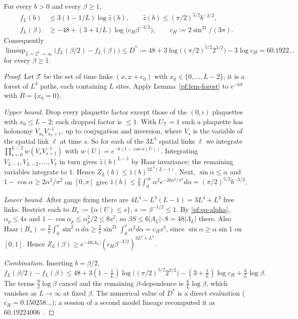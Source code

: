 \begin{lemma}\label{pf:lem-free}
For every $b>0$ and every $\beta\ge1$,
\begin{align*}
f_L(b)&\le3(1-1/L)\log\hat z(b),\qquad \hat z(b)\le(\pi/2)^{5/2}b^{-3/2},\\
f_L(\beta)&\ge-48+(3+1/L)\log\big(c_H\beta^{-3/2}\big),\qquad c_H:=2\sin^21/(3\pi).
\end{align*}
Consequently $\limsup_{L=2^k\to\infty}\big(f_L(\beta/2)-f_L(\beta)\big)\le D^*:=48+3\log\big((\pi/2)^{5/2}2^{3/2}\big)-3\log c_H=60.1922\ldots$ for every $\beta\ge1$.
\end{lemma}

\begin{proof}
Let $\mathcal T$ be the set of time links $(x,x+e_0)$ with $x_0\in\{0,\dots,L-2\}$; it is a forest of $L^3$ paths, each containing $L$ sites. Apply Lemma~\ref{pf:lem-forest} to $e^{-bS}$ with $B=\{x_0=0\}$.

\emph{Upper bound.} Drop every plaquette factor except those of the $(0,i)$ plaquettes with $x_0\le L-2$; each dropped factor is $\le1$. With $U_{\mathcal T}=1$ such a plaquette has holonomy $V_{x_0}V_{x_0+1}^{-1}$, up to conjugation and inversion, where $V_s$ is the variable of the spatial link $\ell$ at time $s$. So for each of the $3L^3$ spatial links $\ell$ we integrate $\prod_{s=0}^{L-2}w(V_sV_{s+1}^{-1})$ with $w(U)=e^{-b(1-\cos\alpha(U))}$. Integrating $V_{L-1},V_{L-2},\dots,V_1$ in turn gives $\hat z(b)^{L-1}$ by Haar invariance; the remaining variables integrate to $1$. Hence $Z_L(b)\le\hat z(b)^{3L^3(L-1)}$. Next, $\sin\alpha\le\alpha$ and $1-\cos\alpha\ge2\alpha^2/\pi^2$ on $[0,\pi]$ give
$\hat z(b)\le\frac2\pi\int_0^\infty\alpha^2e^{-2b\alpha^2/\pi^2}d\alpha=(\pi/2)^{5/2}b^{-3/2}$.

\emph{Lower bound.} After gauge fixing there are $4L^4-L^3(L-1)=3L^4+L^3$ free links. Restrict each to $B_s:=\{\alpha(U)\le s\}$, $s:=\beta^{-1/2}\le1$. By \eqref{pf:eq-alpha}, $\alpha_p\le4s$ and $1-\cos\alpha_p\le\alpha_p^2/2\le8s^2$, so $\beta S\le6|\Lambda_L|\cdot8=48|\Lambda_L|$ there. Also $\mathrm{Haar}(B_s)=\frac2\pi\int_0^s\sin^2\alpha\,d\alpha\ge\frac2\pi\sin^21\int_0^s\alpha^2d\alpha=c_Hs^3$, since $\sin\alpha\ge\alpha\sin1$ on $[0,1]$. Hence $Z_L(\beta)\ge e^{-48|\Lambda_L|}(c_H\beta^{-3/2})^{3L^4+L^3}$.

\emph{Combination.} Inserting $b=\beta/2$,
\[
f_L(\beta/2)-f_L(\beta)\le48+3(1-\tfrac1L)\log\big((\pi/2)^{5/2}2^{3/2}\big)-(3+\tfrac1L)\log c_H+\tfrac6L\log\beta .
\]
The terms $\tfrac92\log\beta$ cancel and the remaining $\beta$-dependence is $\tfrac6L\log\beta$, which vanishes as $L\to\infty$ at fixed $\beta$. The numerical value of $D^*$ is a direct evaluation ($c_H=0.150258\ldots$); a session of a second model lineage recomputed it as $60.19224006$~\cite[comment 7102590992]{RepoThread}.
\end{proof}


